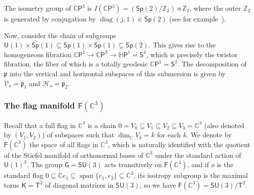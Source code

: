\documentclass[11pt,a4paper,final]{amsart}
\newcommand{\s}{\mathsf}
\newcommand{\g}{\mathfrak}
\newcommand{\C}{\mathbb{C}}
\newcommand{\spann}{\operatorname{span}}
\theoremstyle{definition}
\begin{document}
The isometry group of $\C\mathsf{P}^{3}$ is $I(\C\mathsf{P}^{3})=(\mathsf{Sp}(2)/\mathbb{Z}_{2})\rtimes \mathbb{Z}_{2}$, where the outer $\mathbb{Z}_{2}$ is generated by conjugation by $\operatorname{diag}(j,1)\in\mathsf{Sp}(2)$ (see for example~\cite{ShankarIsometryGroups}).
	
Now, consider the chain of subgroups $\mathsf{U}(1)\times\mathsf{Sp}(1)\subseteq \mathsf{Sp}(1)\times\mathsf{Sp}(1)\subseteq\mathsf{Sp}(2)$.
This gives rise to the homogeneous fibration $\C\mathsf{P}^{1}\to\C\mathsf{P}^{3}\to\mathbb{H}\mathsf{P}^{1}=\mathsf{S}^{4}$, which is precisely the twistor fibration, the fiber of which is a totally geodesic $\C\mathsf{P}^{1}=\mathsf{S}^{2}$.
The decomposition of $\g{p}$ into the vertical and horizontal subspaces of this submersion is given by $\mathcal{V}_{o}=\g{p}_{1}$ and $\mathcal{H}_{o}=\g{p}_{2}$.


\subsubsection{The flag manifold $\mathsf{F}(\C^{3})$}\label{subsection:FlagDescription}
Recall that a full flag in $\C^3$ is a chain $0=V_{0}\subseteq V_{1}\subseteq V_{2}\subseteq V_{3}=\C^3$ (also denoted by $(V_1,V_2)$) of subspaces such that $\dim_{\C}V_{k}=k$ for each $k$.
We denote by $\s{F}(\C^{3})$ the space of all flags in $\C^3$, which is naturally identified with the quotient of the Stiefel manifold of orthonormal bases of $\C^3$ under the standard action of $\s{U}(1)^{3}$.
The group $\s{G}=\s{SU}(3)$ acts transitively on $\s{F}(\C^3)$, and if $o$ is the standard flag $0\subseteq \C e_1\subseteq \spann\{e_1,e_2\}\subseteq \C^3$, its isotropy subgroup is the maximal torus $\s{K}=\s{T}^{2}$ of diagonal matrices in $\s{SU}(3)$, so we have $\s{F}(\C^3)=\s{SU}(3)/\s{T}^{2}$.
	
\end{document}

